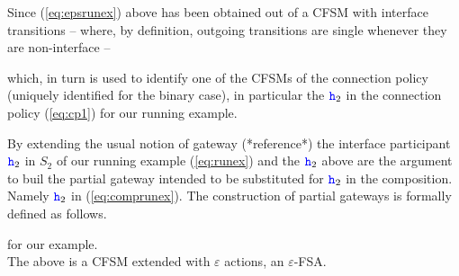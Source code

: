 Since (\ref{eq:epsrunex}) above
has been obtained out of a CFSM with interface transitions -- where, by definition, outgoing
transitions are single whenever they are non-interface --   




which, in turn is used to identify one of the CFSMs of the connection policy (uniquely identified
for the binary case), in particular the ${\mathtt{\color{blue}{ {h}}}}_2$ in the connection policy (\ref{eq:cp1})
for our running example.

By extending the usual notion of gateway (*reference*) the interface participant ${\mathtt{\color{blue}{ {h}}}}_2$ in
$S_2$ of our running example (\ref{eq:runex}) and the ${\mathtt{\color{blue}{ {h}}}}_2$ above  
are the argument to buil the partial gateway intended to be substituted for ${\mathtt{\color{blue}{ {h}}}}_2$ in the composition.
Namely ${\mathtt{\color{blue}{ {h}}}}_2$ in (\ref{eq:comprunex}).
The construction of partial gateways is formally defined as follows.

  


for  our example.\\
The above is  a CFSM extended with $\varepsilon$ actions, an $\varepsilon$-FSA.    


